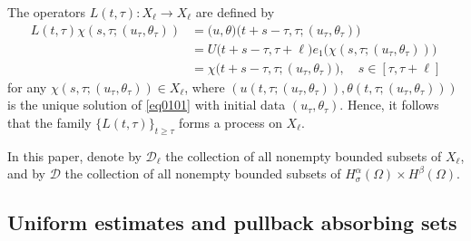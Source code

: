 \documentclass[oneside,preprint,12pt,numbers,sort&compress]{elsarticle}
\begin{document}
The operators $L(t, \tau): X_{\ell} \to X_{\ell}$ are defined by
\begin{align*}
  L(t, \tau)\chi(s, \tau; (u_{\tau}, \theta_{\tau})) 
   & = \bigl(u, \theta\bigr)\bigl(t + s - \tau, \tau; (u_{\tau}, \theta_{\tau})\bigr) \\
   & = U\bigl(t + s - \tau, \tau + \ell \bigr)e_1\bigl(\chi(s, \tau; (u_{\tau}, \theta_{\tau}))\bigr) \\
   & = \chi\bigl(t + s - \tau, \tau; (u_{\tau}, \theta_{\tau})\bigr),
     \quad s \in [\tau, \tau + \ell]
\end{align*}
for any $\chi(s,\tau;(u_{\tau},\theta_{\tau}))\in X_{\ell}$, where $(u(t, \tau; (u_\tau, \theta_\tau)), \theta(t, \tau; (u_\tau, \theta_\tau)))$ is the unique solution of \cref{eq0101} with initial data $(u_{\tau}, \theta_{\tau})$. Hence, it follows that the family $\{L(t,\tau)\}_{t\geq \tau}$ forms a process on $X_{\ell}$.

In this paper, denote by \( \mathcal{D}_{\ell} \) the collection of all nonempty bounded subsets of \( X_{\ell} \), and by \( \mathcal{D} \) the collection of all nonempty bounded subsets of $H_\sigma^{\alpha}(\Omega) \times H^{\beta}(\Omega)$.

\subsection{Uniform estimates and pullback absorbing sets}\label{subsec0301}
\end{document}
